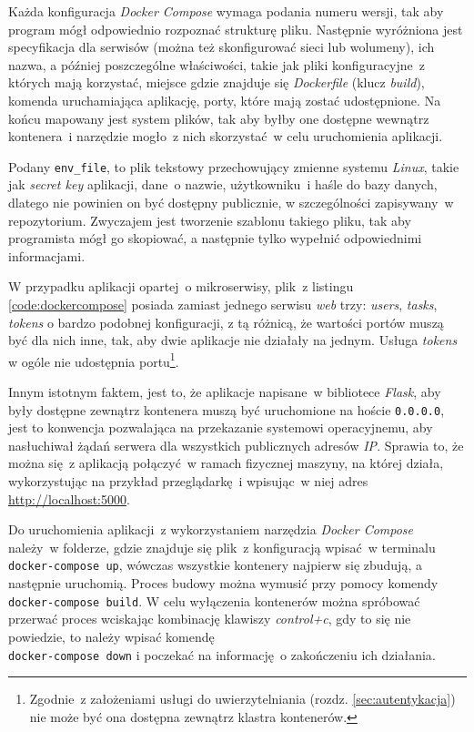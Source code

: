 Każda konfiguracja \textit{Docker Compose} wymaga podania numeru wersji, tak aby program mógł odpowiednio rozpoznać strukturę pliku. Następnie wyróżniona jest specyfikacja dla serwisów (można też skonfigurować sieci lub wolumeny\cite{docker}), ich nazwa, a później poszczególne właściwości, takie jak pliki konfiguracyjne~z których mają korzystać, miejsce gdzie znajduje się \textit{Dockerfile} (klucz \textit{build}), komenda uruchamiająca aplikację, porty, które mają zostać udostępnione. Na końcu mapowany jest system plików, tak aby byłby one dostępne wewnątrz kontenera~i narzędzie mogło~z nich skorzystać~w celu uruchomienia aplikacji.

Podany \verb|env_file|, to plik tekstowy przechowujący zmienne systemu \textit{Linux}\cite{docker}, takie jak \textit{secret key} aplikacji, dane~o nazwie, użytkowniku~i haśle do bazy danych, dlatego nie powinien on być dostępny publicznie, w szczególności zapisywany~w repozytorium. Zwyczajem jest tworzenie szablonu takiego pliku, tak aby programista mógł go skopiować, a następnie tylko wypełnić odpowiednimi informacjami. 

W przypadku aplikacji opartej~o mikroserwisy, plik~z listingu \ref{code:dockercompose} posiada zamiast jednego serwisu \textit{web} trzy: \textit{users}, \textit{tasks}, \textit{tokens} o bardzo podobnej konfiguracji, z tą różnicą, że wartości portów muszą być dla nich inne, tak, aby dwie aplikacje nie działały na jednym. Usługa \textit{tokens} w ogóle nie udostępnia portu\footnote{Zgodnie~z założeniami usługi do uwierzytelniania (rozdz. \ref{sec:autentykacja}) nie może być ona dostępna zewnątrz klastra kontenerów.}.

Innym istotnym faktem, jest to, że aplikacje napisane~w bibliotece \textit{Flask}, aby były dostępne zewnątrz kontenera muszą być uruchomione na hoście \verb|0.0.0.0|, jest to konwencja pozwalająca na przekazanie systemowi operacyjnemu, aby nasłuchiwał żądań serwera dla wszystkich publicznych adresów \textit{IP}\cite{flask}. Sprawia to, że można się~z aplikacją połączyć~w ramach fizycznej maszyny, na której działa, wykorzystując na przykład przeglądarkę~i wpisując~w niej adres \url{http://localhost:5000}.

Do uruchomienia aplikacji~z wykorzystaniem narzędzia \textit{Docker Compose} należy~w folderze, gdzie znajduje się plik~z konfiguracją wpisać~w terminalu \verb|docker-compose up|, wówczas wszystkie kontenery najpierw się zbudują, a następnie uruchomią. Proces budowy można wymusić przy pomocy komendy \verb|docker-compose build|. W celu wyłączenia kontenerów można spróbować przerwać proces wciskając kombinację klawiszy \textit{control+c}, gdy to się nie powiedzie, to należy wpisać komendę \\ \verb|docker-compose down| i poczekać na informację~o zakończeniu ich działania\cite{docker}.

